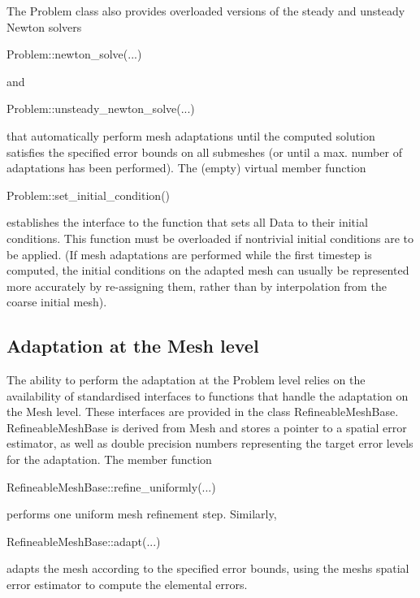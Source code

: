 The {\ttfamily Problem} class also provides overloaded versions of the steady and unsteady Newton solvers 
\begin{DoxyCode}
Problem::newton\_solve(...) 
\end{DoxyCode}
 and 
\begin{DoxyCode}
Problem::unsteady\_newton\_solve(...) 
\end{DoxyCode}
 that automatically perform mesh adaptations until the computed solution satisfies the specified error bounds on all submeshes (or until a max. number of adaptations has been performed). The (empty) virtual member function 
\begin{DoxyCode}
Problem::set\_initial\_condition() 
\end{DoxyCode}
 establishes the interface to the function that sets all {\ttfamily Data} to their initial conditions. This function must be overloaded if nontrivial initial conditions are to be applied. (If mesh adaptations are performed while the first timestep is computed, the initial conditions on the adapted mesh can usually be represented more accurately by re-\/assigning them, rather than by interpolation from the coarse initial mesh).\hypertarget{index_RefineableMeshes}{}\subsection{Adaptation at the Mesh level}\label{index_RefineableMeshes}
The ability to perform the adaptation at the {\ttfamily Problem} level relies on the availability of standardised interfaces to functions that handle the adaptation on the {\ttfamily Mesh} level. These interfaces are provided in the class {\ttfamily Refineable\+Mesh\+Base}. {\ttfamily Refineable\+Mesh\+Base} is derived from {\ttfamily Mesh} and stores a pointer to a spatial error estimator, as well as double precision numbers representing the target error levels for the adaptation. The member function 
\begin{DoxyCode}
RefineableMeshBase::refine\_uniformly(...) 
\end{DoxyCode}
 performs one uniform mesh refinement step. Similarly, 
\begin{DoxyCode}
RefineableMeshBase::adapt(...) 
\end{DoxyCode}
 adapts the mesh according to the specified error bounds, using the mesh\textquotesingle{}s spatial error estimator to compute the elemental errors.

